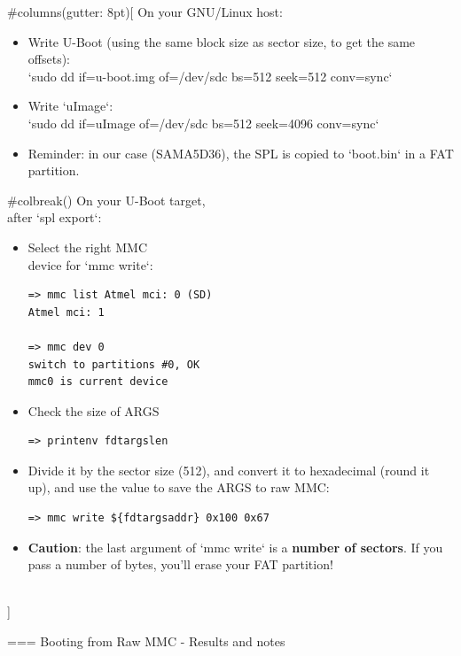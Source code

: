 #columns(gutter: 8pt)[
    On your GNU/Linux host:
    \begin{itemize}
	\item Write U-Boot (using the same block size as sector size, to
	      get the same offsets):\\
	      `sudo dd if=u-boot.img of=/dev/sdc bs=512 seek=512 conv=sync`
	\item Write `uImage`:\\
	      `sudo dd if=uImage of=/dev/sdc bs=512 seek=4096 conv=sync`
	\item Reminder: in our case (SAMA5D36), the SPL is copied to
	      `boot.bin` in a FAT partition.
    \end{itemize}
     #colbreak()
    On your U-Boot target,\\
    after `spl export`:
    \begin{itemize}
	\item Select the right MMC\\
        device for `mmc write`:
	\begin{verbatim}
=> mmc list Atmel mci: 0 (SD)
Atmel mci: 1

=> mmc dev 0
switch to partitions #0, OK
mmc0 is current device
\end{verbatim}
	\item Check the size of ARGS
\begin{verbatim}
=> printenv fdtargslen
\end{verbatim}

        \item Divide it by the sector size (512), and convert it to
              hexadecimal (round it up), and use the value to save the ARGS to raw MMC:
\begin{verbatim}
=> mmc write ${fdtargsaddr} 0x100 0x67
\end{verbatim}
	\item {\bf Caution}: the last argument of `mmc write` is a
	      {\bf number of sectors}. If you pass a number of bytes, you'll erase your
	      FAT partition!
    \end{itemize}
   \\]


=== {Booting from Raw MMC - Results and notes}
  \scriptsize
  
